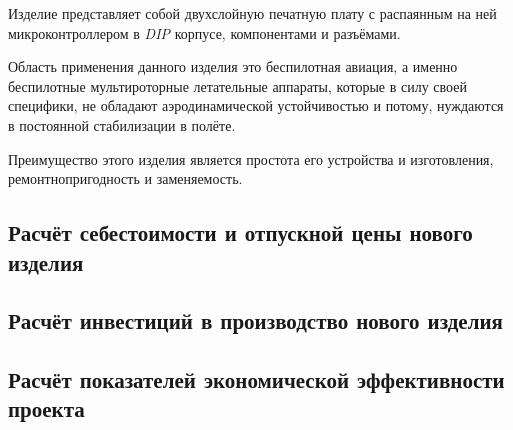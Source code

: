 Изделие представляет собой двухслойную печатную плату с распаянным на
ней микроконтроллером в \textit{DIP} корпусе, компонентами и
разъёмами.

Область применения данного изделия это беспилотная авиация, а именно
беспилотные мультироторные летательные аппараты, которые в силу своей
специфики, не обладают аэродинамической устойчивостью и потому,
нуждаются в постоянной стабилизации в полёте.


Преимущество этого изделия является простота его устройства и
изготовления, ремонтнопригодность и заменяемость.

\subsection{Расчёт себестоимости и отпускной цены нового изделия}

\subsection{Расчёт инвестиций в производство нового изделия}

\subsection{Расчёт показателей экономической эффективности проекта}




\newpage

